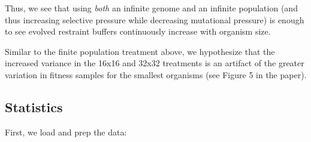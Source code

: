 \documentclass[
]{book}
\begin{document}
Thus, we see that using \emph{both} an infinite genome and an infinite population (and thus increasing selective pressure while decreasing mutational pressure) is enough to see evolved restraint buffers continuously increase with organism size.

Similar to the finite population treatment above, we hypothesize that the increased variance in the 16x16 and 32x32 treatments is an artifact of the greater variation in fitness samples for the smallest organisms (see Figure 5 in the paper).

\hypertarget{statistics-9}{%
\subsection{Statistics}\label{statistics-9}}

First, we load and prep the data:
\end{document}
